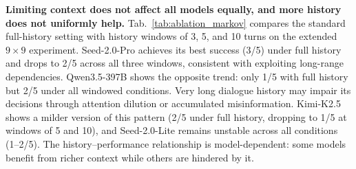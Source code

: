 \documentclass{llmxive}
\begin{document}
\noindent\textbf{Limiting context does not affect all models equally, and more history does not uniformly help.}\label{sec:appendix_markov}
Tab.~\ref{tab:ablation_markov} compares the standard full-history setting with history windows of 3, 5, and 10 turns on the extended $9{\times}9$ experiment. Seed-2.0-Pro achieves its best success (3/5) under full history and drops to 2/5 across all three windows, consistent with exploiting long-range dependencies. Qwen3.5-397B shows the opposite trend: only 1/5 with full history but 2/5 under all windowed conditions. Very long dialogue history may impair its decisions through attention dilution or accumulated misinformation. Kimi-K2.5 shows a milder version of this pattern (2/5 under full history, dropping to 1/5 at windows of 5 and 10), and Seed-2.0-Lite remains unstable across all conditions (1--2/5). The history--performance relationship is model-dependent: some models benefit from richer context while others are hindered by it.
\end{document}
